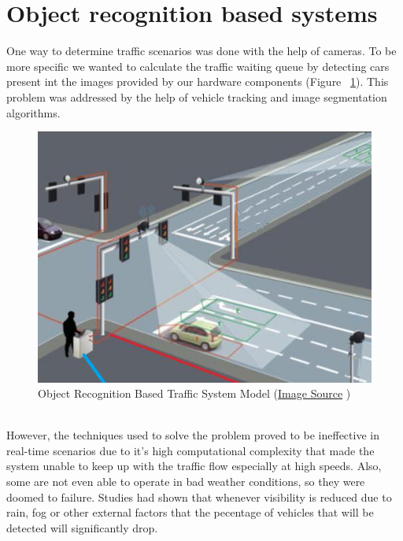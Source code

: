 \documentclass[17pt]{report}
\begin{document}
\section{Object recognition based systems}
\indent \indent
One way to determine traffic scenarios was done with
the help of cameras. To be more specific we wanted to 
calculate the traffic waiting queue by detecting cars 
present int the images provided by our hardware components (Figure ~\ref{fig:ObjectRecognitionSystem}).
This problem was addressed by the help of vehicle tracking
and image segmentation algorithms.
\begin{figure}[h!]
    \includegraphics[width=\textwidth]{ObjectRecognitionSystemRepresentation.png}
    \caption{Object Recognition Based Traffic System Model 
    (\href{https://english.mathrubhumi.com/news/kerala/knowing-traffic-camera-locations-isn-t-enough-to-escape-from-them-mvd-can-move-them-easily-1.7427787}{Image Source} \textcopyright)}
    \label{fig:ObjectRecognitionSystem}
\end{figure}
\\
\indent \indent
However, the techniques used to solve the problem proved to 
be ineffective in real-time scenarios due to it's high
computational complexity that made the system unable to keep up 
with the traffic flow especially at high speeds.
Also, some are not even able to operate in bad weather conditions,
so they were doomed to failure. Studies had shown that whenever
visibility is reduced due to rain, fog or other external factors that
the pecentage of vehicles that will be detected will significantly drop.
\cite{Sheeny2021} \\
\end{document}
